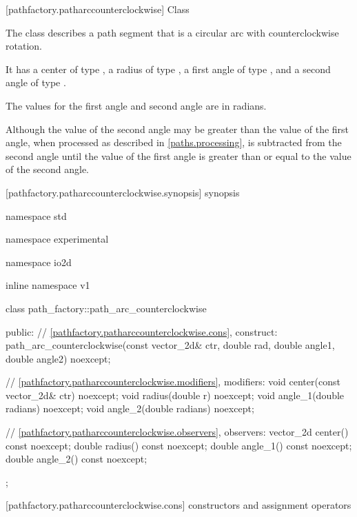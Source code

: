  [pathfactory.patharccounterclockwise] {Class }

\pnum
{}
The class  describes a path segment that is a circular arc with counterclockwise rotation.

\pnum
It has a center of type , a radius of type , a first angle of type , and a second angle of type .

\pnum
The values for the first angle and second angle are in radians.

\pnum
\enternote
Although the value of the second angle may be greater than the value of the first angle, when processed as described in \ref{paths.processing},  is subtracted from the second angle until the value of the first angle is greater than or equal to the value of the second angle.
\exitnote

 [pathfactory.patharccounterclockwise.synopsis] { synopsis}

\begin{codeblock}
namespace std { namespace experimental { namespace io2d { inline namespace v1 {
  class path_factory::path_arc_counterclockwise {
  public:
    // \ref{pathfactory.patharccounterclockwise.cons}, construct:
    path_arc_counterclockwise(const vector_2d& ctr, double rad, double angle1,
      double angle2) noexcept;

    // \ref{pathfactory.patharccounterclockwise.modifiers}, modifiers:
    void center(const vector_2d& ctr) noexcept;
    void radius(double r) noexcept;
    void angle_1(double radians) noexcept;
    void angle_2(double radians) noexcept;

    // \ref{pathfactory.patharccounterclockwise.observers}, observers:
    vector_2d center() const noexcept;
    double radius() const noexcept;
    double angle_1() const noexcept;
    double angle_2() const noexcept;
  };
} } } }
\end{codeblock}

 [pathfactory.patharccounterclockwise.cons] { constructors and assignment operators}

